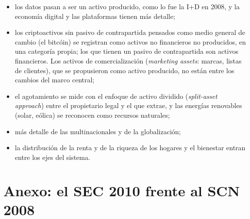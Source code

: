 \documentclass[11pt]{article}
\begin{document}
\begin{itemize}
\begin{itemize}
  \item los datos pasan a ser un activo producido, como lo fue la I+D en 2008, y la economía digital y las plataformas tienen más detalle;
  \item los criptoactivos sin pasivo de contrapartida pensados como medio general de cambio (el bitcóin) se registran como activos no financieros no producidos, en una categoría propia; los que tienen un pasivo de contrapartida son activos financieros. Los activos de comercialización (\emph{marketing assets}: marcas, listas de clientes), que se propusieron como activo producido, no están entre los cambios del marco central\nocite{Harper2025SNA};
  \item el agotamiento se mide con el enfoque de activo dividido (\emph{split-asset approach}) entre el propietario legal y el que extrae, y las energías renovables (solar, eólica) se reconocen como recursos naturales\nocite{Harper2025SNA};
  \item más detalle de las multinacionales y de la globalización;
  \item la distribución de la renta y de la riqueza de los hogares y el bienestar entran entre los ejes del sistema.
  \end{itemize}
\end{itemize}

\section{Anexo: el SEC 2010 frente al SCN 2008}\label{anexo:scn2008}
\end{document}
